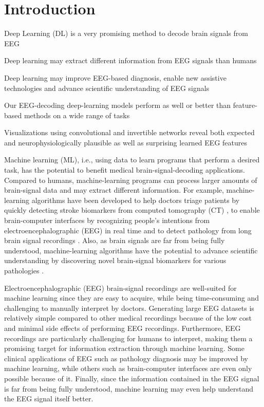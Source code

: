\chapter{Introduction}\label{introduction}

\begin{startbox}{Deep Learning (DL) is a very promising method to decode brain signals from EEG}
\item Deep learning may extract different information from EEG signals than humans
\item Deep learning may improve EEG-based diagnosis, enable new assistive technologies and advance scientific understanding of EEG signals
\item Our EEG-decoding deep-learning models perform as well or better than feature-based methods on a wide range of tasks
\item Visualizations using convolutional and invertible networks reveal both expected and neurophysiologically plausible as well as surprising learned EEG features
\end{startbox}


Machine learning (ML), i.e., using data to learn programs that perform a
desired task, has the potential to benefit medical brain-signal-decoding
applications. Compared to humans, machine-learning programs can process
larger amounts of brain-signal data and may extract different
information. For example, machine-learning algorithms have been
developed to help doctors triage patients by quickly detecting stroke
biomarkers from computed tomography (CT)
\citep{chavva2022deep}, to enable brain-computer interfaces
by recognizing people's intentions from electroencephalographic (EEG) in
real time \citep{abiri2019comprehensive} and to detect
pathology from long brain signal recordings
\citep{gemein2020machine,schirrmeisterdeeppathology}. Also,
as brain signals are far from being fully understood, machine-learning
algorithms have the potential to advance scientific understanding by
discovering novel brain-signal biomarkers for various pathologies
\citep{raghu2020survey}.


    Electroencephalographic (EEG) brain-signal recordings are well-suited
for machine learning since they are easy to acquire, while being
time-consuming and challenging to manually interpret by doctors.
Generating large EEG datasets is relatively simple compared to other
medical recordings because of the low cost and minimal side effects of
performing EEG recordings. Furthermore, EEG recordings are particularly
challenging for humans to interpret, making them a promising target for
information extraction through machine learning. Some clinical
applications of EEG such as pathology diagnosis may be improved by
machine learning, while others such as brain-computer interfaces are
even only possible because of it. Finally, since the information
contained in the EEG signal is far from being fully understood, machine
learning may even help understand the EEG signal itself better.

